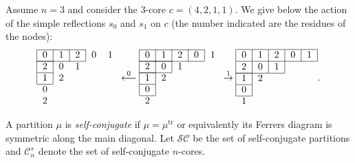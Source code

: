 \documentclass[pdftex]{sigma}
\numberwithin{equation}{section}
\newcommand{\cC}{\mathcal{C}}
\begin{document}
\begin{Example}
Assume $n=3$ and consider the $3$-core $c=(4,2,1,1)$. We give below the
action of the simple reflections $s_{0}$ and $s_{1}$ on $c$ (the number
indicated are the residues of the nodes):
\begin{equation*}
\begin{tabular}{lllll}
\cline{1-3}
\multicolumn{1}{|l}{$0$} & \multicolumn{1}{|l}{$1$} & \multicolumn{1}{|l}{$2$%
} & \multicolumn{1}{|l}{$0$} & $1$ \\ \cline{1-1}\cline{1-3}
\multicolumn{1}{|l}{$2$} & \multicolumn{1}{|l}{$0$} & $1$ & & \\
\cline{1-1}
\multicolumn{1}{|l}{$1$} & \multicolumn{1}{|l}{$2$} & & & \\ \cline{1-1}
$0$ & & & & \\
$2$ & & & &
\end{tabular}%
\overset{0}{\longleftarrow }%
\begin{tabular}{lllll}
\cline{1-4}
\multicolumn{1}{|l}{$0$} & \multicolumn{1}{|l}{$1$} & \multicolumn{1}{|l}{$2$%
} & \multicolumn{1}{|l}{$0$} & \multicolumn{1}{|l}{$1$} \\
\cline{1-2}\cline{1-4}
\multicolumn{1}{|l}{$2$} & \multicolumn{1}{|l}{$0$} & \multicolumn{1}{|l}{$1$%
} & & \\ \cline{1-1}\cline{1-2}
\multicolumn{1}{|l}{$1$} & \multicolumn{1}{|l}{$2$} & & & \\ \cline{1-1}
\multicolumn{1}{|l}{$0$} & \multicolumn{1}{|l}{} & & & \\ \cline{1-1}
$2$ & & & &
\end{tabular}%
\overset{1}{\rightarrow }%
\begin{tabular}{lllll}
\hline
\multicolumn{1}{|l}{$0$} & \multicolumn{1}{|l}{$1$} & \multicolumn{1}{|l}{$2$%
} & \multicolumn{1}{|l}{$0$} & \multicolumn{1}{|l|}{$1$} \\ \hline
\multicolumn{1}{|l}{$2$} & \multicolumn{1}{|l}{$0$} & \multicolumn{1}{|l}{$1$%
} & \multicolumn{1}{|l}{} & \\ \cline{1-1}\cline{1-3}
\multicolumn{1}{|l}{$1$} & \multicolumn{1}{|l}{$2$} & & & \\ \cline{1-1}
\multicolumn{1}{|l}{$0$} & \multicolumn{1}{|l}{} & & & \\ \cline{1-1}
$1$ & & & &
\end{tabular}.%
\end{equation*}
\end{Example}


A partition $\mu$ is \textit{self-conjugate} if $\mu=\mu^{\mathrm{tr}}$ or equivalently its Ferrers diagram is symmetric along the main diagonal. Let $\mathcal{SC}$ be the set of self-conjugate partitions and $\cC_{n}^s$ denote the set of self-conjugate $n$-cores.
\end{document}

